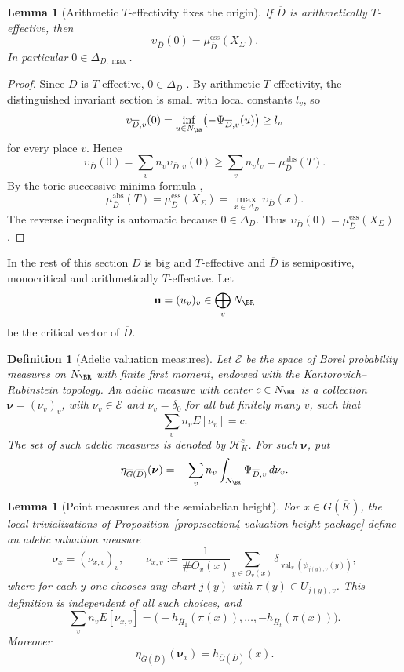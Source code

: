\documentclass[10pt,a4paper]{amsart}
\theoremstyle{plain}
\newtheorem{definition}[theorem]{Definition}
\newtheorem{lemma}[theorem]{Lemma}
\DeclareMathOperator{\val}{val}
\theoremstyle{plain}
\numberwithin{equation}{section}
\providecommand{\bD}{\overline{D}}
\providecommand{\muess}{\mu^{\mathrm{ess}}}
\providecommand{\muabs}{\mu^{\mathrm{abs}}}
\begin{document}
\begin{lemma}[Arithmetic \(T\)-effectivity fixes the origin]
	\label{lem:arith-teff-origin}
	If \(\bD\) is arithmetically \(T\)-effective, then
	\[
	\upsilon_{\bD}(0)=\muess_{\bD}(X_\Sigma).
	\]
	In particular \(0\in\Delta_{D,\max}\).
\end{lemma}

\begin{proof}
	Since \(D\) is \(T\)-effective, \(0\in\Delta_D\)
	\cite[Proposition 4.9]{BMPS22}.  By arithmetic \(T\)-effectivity, the
	distinguished invariant section is small with local constants \(l_v\), so
	\[
	\upsilon_{\bD,v}(0)
	=
	\inf_{u\in N_\BR}\bigl(-\Psi_{\bD,v}(u)\bigr)
	\ge l_v
	\]
	for every place \(v\).  Hence
	\[
	\upsilon_{\bD}(0)
	=\sum_v n_v\upsilon_{\bD,v}(0)
	\ge \sum_v n_vl_v
	=\muabs_{\bD}(T).
	\]
	By the toric successive-minima formula
	\cite[Theorem 3.9 and Corollary 3.10]{BGPS15},
	\[
	\muabs_{\bD}(T)=\muess_{\bD}(X_\Sigma)
	=\max_{x\in\Delta_D}\upsilon_{\bD}(x).
	\]
	The reverse inequality is automatic because \(0\in\Delta_D\).  Thus
	\(\upsilon_{\bD}(0)=\muess_{\bD}(X_\Sigma)\).
\end{proof}

In the rest of this section \(D\) is big and \(T\)-effective and \(\bD\) is
semipositive, monocritical and arithmetically \(T\)-effective.  Let
\[
\mathbf u=(u_v)_v\in\bigoplus_vN_\BR
\]
be the critical vector of \(\bD\).

\begin{definition}[Adelic valuation measures]
	\label{def:adelic-valuation-measures}
	Let \(\mathcal E\) be the space of Borel probability measures on \(N_\BR\) with
	finite first moment, endowed with the Kantorovich--Rubinstein topology.  An
	adelic measure with center \(c\in N_\BR\) is a collection
	\(\boldsymbol\nu=(\nu_v)_v\), with \(\nu_v\in\mathcal E\) and
	\(\nu_v=\delta_0\) for all but finitely many \(v\), such that
	\[
	\sum_v n_vE[\nu_v]=c.
	\]
	The set of such adelic measures is denoted by \(\mathcal H_K^c\).  For such
	\(\boldsymbol\nu\), put
	\[
	\eta_{\overline G(\bD)}(\boldsymbol\nu)
	=
	-\sum_v n_v\int_{N_\BR}\Psi_{\bD,v}\,d\nu_v.
	\]
\end{definition}

\begin{lemma}[Point measures and the semiabelian height]
	\label{lem:point-measure-height}
	For \(x\in G(\overline K)\), the local trivializations of
	Proposition~\ref{prop:section4-valuation-height-package} define an adelic
	valuation measure
	\[
	\boldsymbol\nu_x=(\nu_{x,v})_v,\qquad
	\nu_{x,v}:=\frac1{\#O_v(x)}
	\sum_{y\in O_v(x)}\delta_{\val_v(\psi_{j(y),v}(y))},
	\]
	where for each \(y\) one chooses any chart \(j(y)\) with
	\(\pi(y)\in U_{j(y),v}\).  This definition is independent of all such choices,
	and
	\[
	\sum_v n_vE[\nu_{x,v}]
	=
	\bigl(-h_{\overline H_1}(\pi(x)),\ldots,
	-h_{\overline H_t}(\pi(x))\bigr).
	\]
	Moreover
	\[
	\eta_{\overline G(\bD)}(\boldsymbol\nu_x)
	=h_{\overline G(\bD)}(x).
	\]
\end{lemma}
\end{document}
